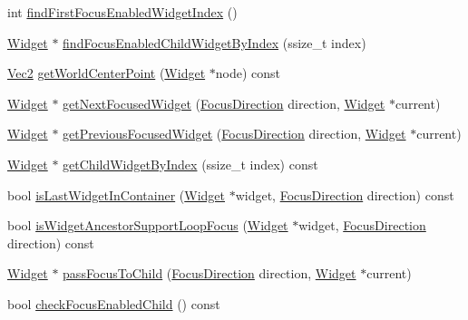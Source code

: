 \begin{DoxyCompactItemize}
\item 
int \hyperlink{classui_1_1Layout_a9a84f2518571e511862189f3c230b984}{find\+First\+Focus\+Enabled\+Widget\+Index} ()
\item 
\hyperlink{classui_1_1Widget}{Widget} $\ast$ \hyperlink{classui_1_1Layout_a6b9e5fe4f9a42d75be143446661d7b24}{find\+Focus\+Enabled\+Child\+Widget\+By\+Index} (ssize\+\_\+t index)
\item 
\hyperlink{classVec2}{Vec2} \hyperlink{classui_1_1Layout_af1792e929add190f4d14bef493139e5d}{get\+World\+Center\+Point} (\hyperlink{classui_1_1Widget}{Widget} $\ast$node) const
\item 
\hyperlink{classui_1_1Widget}{Widget} $\ast$ \hyperlink{classui_1_1Layout_ac1b7e6f28ae57fd9f8921f325c22bb64}{get\+Next\+Focused\+Widget} (\hyperlink{classui_1_1Widget_a8ae8e8fc793a04a87584205cd1e8a8a5}{Focus\+Direction} direction, \hyperlink{classui_1_1Widget}{Widget} $\ast$current)
\item 
\hyperlink{classui_1_1Widget}{Widget} $\ast$ \hyperlink{classui_1_1Layout_aef63ee3e6623dd6c7cbde8e8ee19c5c1}{get\+Previous\+Focused\+Widget} (\hyperlink{classui_1_1Widget_a8ae8e8fc793a04a87584205cd1e8a8a5}{Focus\+Direction} direction, \hyperlink{classui_1_1Widget}{Widget} $\ast$current)
\item 
\hyperlink{classui_1_1Widget}{Widget} $\ast$ \hyperlink{classui_1_1Layout_a2b35ce1ed11a45f7628305a32029c083}{get\+Child\+Widget\+By\+Index} (ssize\+\_\+t index) const
\item 
bool \hyperlink{classui_1_1Layout_a9e1c7e418530e4aab91e387af02afd41}{is\+Last\+Widget\+In\+Container} (\hyperlink{classui_1_1Widget}{Widget} $\ast$widget, \hyperlink{classui_1_1Widget_a8ae8e8fc793a04a87584205cd1e8a8a5}{Focus\+Direction} direction) const
\item 
bool \hyperlink{classui_1_1Layout_a3cfeefdfb70916a5673b337ea5b97666}{is\+Widget\+Ancestor\+Support\+Loop\+Focus} (\hyperlink{classui_1_1Widget}{Widget} $\ast$widget, \hyperlink{classui_1_1Widget_a8ae8e8fc793a04a87584205cd1e8a8a5}{Focus\+Direction} direction) const
\item 
\hyperlink{classui_1_1Widget}{Widget} $\ast$ \hyperlink{classui_1_1Layout_ade484ea5501c2866bf72bd35d6aa14ff}{pass\+Focus\+To\+Child} (\hyperlink{classui_1_1Widget_a8ae8e8fc793a04a87584205cd1e8a8a5}{Focus\+Direction} direction, \hyperlink{classui_1_1Widget}{Widget} $\ast$current)
\item 
bool \hyperlink{classui_1_1Layout_a54ff2aaad412b2ac3503fb75d9cb34bf}{check\+Focus\+Enabled\+Child} () const
\item 

\end{DoxyCompactItemize}
